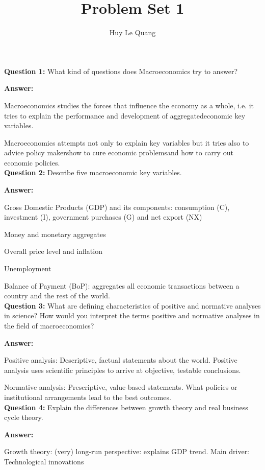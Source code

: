 \documentclass[a4paper, 11pt]{article}
\title{Problem Set 1}
\author{Huy Le Quang}
\begin{document}
\maketitle

\textbf{Question 1:} What kind of questions does Macroeconomics try to answer? 

\textbf{Answer:} 

Macroeconomics studies the forces that influence the economy as a whole, i.e. it tries to explain the performance and development of aggregatedeconomic key variables.

Macroeconomics attempts not only to explain key variables but it tries also to advice policy makershow to cure economic problemsand how to carry out economic policies. \\

\textbf{Question 2:} Describe five macroeconomic key variables. 

\textbf{Answer:} 

Gross Domestic Products (GDP) and its components: consumption (C), investment (I), government purchases (G) and net export (NX) 

Money and monetary aggregates 

Overall price level and inflation 

Unemployment 

Balance of Payment (BoP): aggregates all economic transactions between a country and the rest of the world. \\

\textbf{Question 3:} What are defining characteristics of positive and normative analyses in science? How would you interpret the terms positive and normative analyses in the field of macroeconomics? 

\textbf{Answer:}

Positive analysis: Descriptive, factual statements about the world. Positive analysis uses scientific principles to arrive at objective, testable conclusions. 

Normative analysis: Prescriptive, value-based statements. What policies or institutional arrangements lead to the best outcomes. \\

\textbf{Question 4:} Explain the differences between growth theory and real business cycle theory. 

\textbf{Answer:}

Growth theory: (very) long-run perspective: explains GDP trend. Main driver: Technological innovations 
\end{document}
